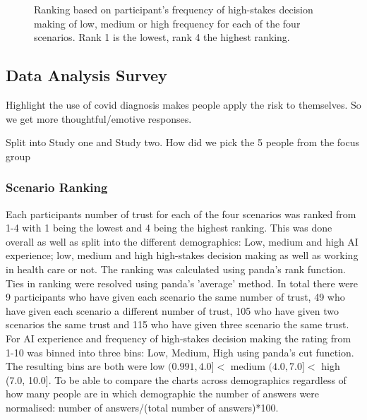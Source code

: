 \documentclass[manuscript,screen,review]{acmart}
\begin{document}
\begin{figure}[h]
    \caption{Ranking based on participant's frequency of high-stakes decision making of low, medium or high frequency for each of the four scenarios. Rank 1 is the lowest, rank 4 the highest ranking.}
    \label{fig:ranking-highstakes-decision}
\end{figure}

\subsection{Data Analysis Survey}


Highlight the use of covid diagnosis makes people apply the risk to themselves. So we get more thoughtful/emotive responses.

Split into Study one and Study two.
How did we pick the 5 people from the focus group

\subsubsection{Scenario Ranking}

Each participants number of trust for each of the four scenarios was ranked from 1-4 with 1 being the lowest and 4 being the highest ranking. This was done overall as well as split into the different demographics: Low, medium and high AI experience; low, medium and high high-stakes decision making as well as working in health care or not. The ranking was calculated using panda's rank function. Ties in ranking were resolved using panda's 'average' method\cite{mckinney-proc-scipy-2010}. In total there were 9 participants who have given each scenario the same number of trust, 49 who have given each scenario a different number of trust, 105 who have given two scenarios the same trust and 115 who have given three scenario the same trust. For AI experience and frequency of high-stakes decision making the rating from 1-10 was binned into three bins: Low, Medium, High using panda's cut function\cite{mckinney-proc-scipy-2010}. The resulting bins are both were low $(0.991, 4.0] <$ medium $(4.0, 7.0] <$ high (7.0, 10.0]. To be able to compare the charts across demographics regardless of how many people are in which demographic the number of answers were normalised: number of answers/(total number of answers)*100.
\end{document}

